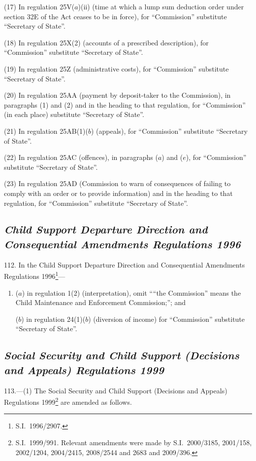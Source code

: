 \documentclass[12pt,a4paper]{article}
\begin{document}
(17) In regulation 25V($a$)(ii)  (time at which a lump sum deduction order under section 32E of the Act ceases to be in force), for “Commission” substitute “Secretary of State”.

(18) In regulation 25X(2) (accounts of a prescribed description), for “Commission” substitute “Secretary of State”.

(19) In regulation 25Z (administrative costs), for “Commission” substitute “Secretary of State”.

(20) In regulation 25AA (payment by deposit-taker to the Commission), in paragraphs (1) and (2) and in the heading to that regulation, for “Commission” (in each place) substitute “Secretary of State”.

(21) In regulation 25AB(1)($b$)  (appeals), for “Commission” substitute “Secretary of State”.

(22) In regulation 25AC (offences), in paragraphs ($a$)  and ($e$), for “Commission” substitute “Secretary of State”.

(23) In regulation 25AD (Commission to warn of consequences of failing to comply with an order or to provide information) and in the heading to that regulation, for “Commission” substitute “Secretary of State”.

\subsection*{\itshape Child Support Departure Direction and Consequential Amendments Regulations 1996}

112.  In the Child Support Departure Direction and Consequential Amendments Regulations 1996\footnote{S.I.~1996/2907.}—
\begin{enumerate}\item[]
($a$) in regulation 1(2) (interpretation), omit ““the Commission” means the Child Maintenance and Enforcement Commission;”; and

($b$) in regulation 24(1)($b$)  (diversion of income) for “Commission” substitute “Secretary of State”.
\end{enumerate}

\subsection*{\itshape Social Security and Child Support (Decisions and Appeals) Regulations 1999}

113.---(1)  The Social Security and Child Support (Decisions and Appeals) Regulations 1999\footnote{S.I.~1999/991. Relevant amendments were made by S.I.~2000/3185, 2001/158, 2002/1204, 2004/2415, 2008/2544 and 2683 and 2009/396.} are amended as follows.
\end{document}
